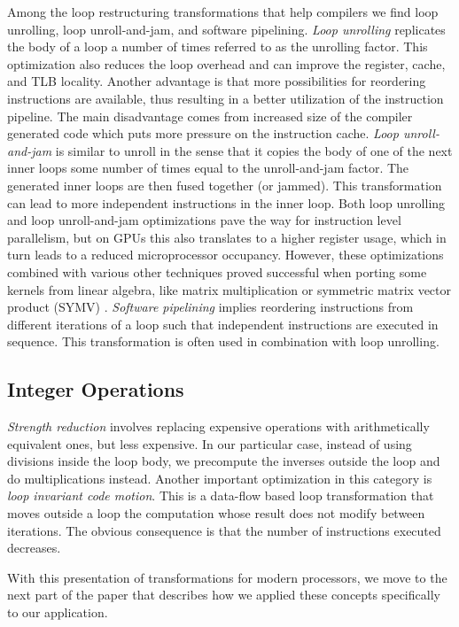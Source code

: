 Among the loop restructuring transformations that help compilers we find loop
unrolling, loop unroll-and-jam, and software pipelining. \textit{Loop unrolling}
replicates the body of a loop a number of times referred to as the unrolling
factor. This optimization also reduces the loop overhead and can improve the
register, cache, and TLB locality. Another advantage is that more possibilities
for reordering instructions are available, thus resulting in a better
utilization of the instruction pipeline. The main disadvantage comes from
increased size of the compiler generated code which puts more pressure on the
instruction cache. \textit{Loop unroll-and-jam} is similar to unroll in the
sense that it copies the body of one of the next inner loops some number of
times equal to the unroll-and-jam factor. The generated inner loops are then
fused together (or jammed). This transformation can lead to more independent
instructions in the inner loop. Both loop unrolling and loop unroll-and-jam
optimizations pave the way for instruction level parallelism, but on GPUs this
also translates to a higher register usage, which in turn leads to a reduced
microprocessor occupancy. However, these optimizations combined with various
other techniques proved successful when porting some kernels from linear
algebra, like matrix multiplication \cite{Volkov:2008:BGT:1413370.1413402} or
symmetric matrix vector product (SYMV) \cite{Nath:2011:OSD:2063384.2063392}.
\textit{Software pipelining} implies reordering instructions from different
iterations of a loop such that independent instructions are executed in
sequence. This transformation is often used in combination with loop unrolling.

\subsection{Integer Operations}

\textit{Strength reduction} involves replacing expensive operations with
arithmetically equivalent ones, but less expensive. In our particular case,
instead of using divisions inside the loop body, we precompute the inverses
outside the loop and do multiplications instead. Another important optimization
in this category is \textit{loop invariant code motion}. This is a data-flow
based loop transformation that moves outside a loop the computation whose result
does not modify between iterations. The obvious consequence is that the number
of instructions executed decreases.

With this presentation of transformations for modern processors, we move to the
next part of the paper that describes how we applied these concepts specifically
to our application.
